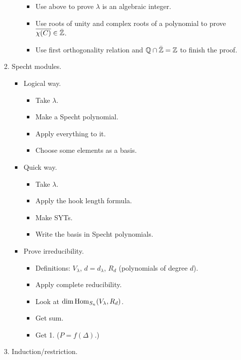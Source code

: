 \documentclass[../notes.tex]{subfiles}
\begin{document}
\begin{itemize}
\begin{enumerate}
\begin{itemize}
\begin{itemize}
                \item Use above to prove $\lambda$ is an algebraic integer.
                \item Use roots of unity and complex roots of a polynomial to prove $\overline{\chi(C)}\in\bar{\mathbb{Z}}$.
                \item Use first orthogonality relation and $\mathbb{Q}\cap\bar{\mathbb{Z}}=\mathbb{Z}$ to finish the proof.
            \end{itemize}
        \end{itemize}
        \item Specht modules.
        \begin{itemize}
            \item Logical way.
            \begin{itemize}
                \item Take $\lambda$.
                \item Make a Specht polynomial.
                \item Apply everything to it.
                \item Choose some elements as a basis.
            \end{itemize}
            \item Quick way.
            \begin{itemize}
                \item Take $\lambda$.
                \item Apply the hook length formula.
                \item Make SYTs.
                \item Write the basis in Specht polynomials.
            \end{itemize}
            \item Prove irreducibility.
            \begin{itemize}
                \item Definitions: $V_\lambda$, $d=d_\lambda$, $R_d$ (polynomials of degree $d$).
                \item Apply complete reducibility.
                \item Look at $\dim\operatorname{Hom}_{S_n}(V_\lambda,R_d)$.
                \item Get sum.
                \item Get 1. ($P=f(\Delta)$.)
            \end{itemize}
        \end{itemize}
        \item Induction/restriction.

\end{enumerate}
\end{itemize}
\end{document}
